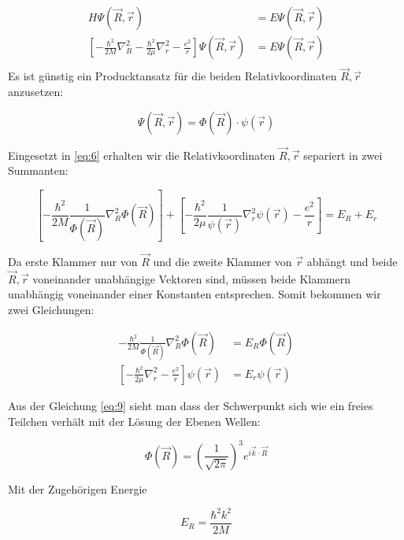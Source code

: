 \begin{align}
  \label{eq:6}
  H\Psi(\vec R,\vec r) &= E\Psi(\vec R,\vec r) \\
\left[-\frac{\hbar^2}{2M}\nabla^2_R - \frac{\hbar^2}{2\mu}\nabla^2_r - \frac{e^2}{r}\right]\Psi(\vec R,\vec r) &= E\Psi(\vec R,\vec r) \\
\end{align}
Es ist günstig ein Producktansatz für die beiden Relativkoordinaten \(\vec R,\vec r\) anzusetzen:

\begin{equation}
  \label{eq:7}
  \Psi(\vec R,\vec r) = \Phi(\vec R) \cdot \psi(\vec r)
\end{equation}

Eingesetzt in \eqref{eq:6} erhalten wir die Relativkoordinaten \(\vec R,\vec r\) separiert in zwei Summanten:

\begin{equation}
  \label{eq:8}
  \left[-\frac{\hbar^2}{2M}\frac{1}{\Phi(\vec R)}\nabla_R^2\Phi(\vec R)  \right]+\left[-\frac{\hbar^2}{2\mu}\frac{1}{\psi(\vec r)}\nabla_r^2\psi(\vec r) - \frac{e^2}{r} \right] = E_R+E_r
\end{equation}

Da erste Klammer nur von \(\vec R\) und die zweite Klammer von \(\vec r\) abhängt und beide  \(\vec R,\vec r\) voneinander unabhängige Vektoren sind, müssen beide Klammern unabhängig voneinander einer Konstanten entsprechen. Somit bekommen wir zwei Gleichungen:

\begin{align}
 -\frac{\hbar^2}{2M}\frac{1}{\Phi(\vec R)}\nabla_R^2\Phi(\vec R)  &= E_R\Phi(\vec R) \label{eq:9} \\
\left[-\frac{\hbar^2}{2\mu}\nabla_r^2 - \frac{e^2}{r} \right]\psi(\vec r) &= E_r\psi(\vec r) \label{eq:10}
\end{align}

Aus der Gleichung \eqref{eq:9} sieht man dass der Schwerpunkt sich wie ein freies Teilchen verhält mit der Lösung der Ebenen Wellen:

\begin{equation}
  \label{eq:11}
  \Phi(\vec R) = \left( \frac{1}{\sqrt{2\pi}}\right)^3 e^{i\vec k\cdot\vec R}
\end{equation}

Mit der Zugehörigen Energie

\begin{equation}
  \label{eq:12}
  E_R = \frac{\hbar^2k^2}{2M}
\end{equation}

